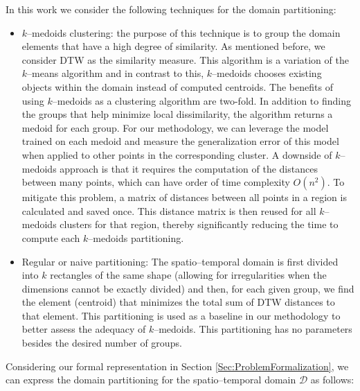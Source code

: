 In this work we consider the following techniques for the domain partitioning:

\begin{itemize}%
	\item $k$--medoids clustering: the purpose of this technique is to group the domain elements that have a high degree of similarity. As mentioned before, we consider DTW as the similarity measure. This algorithm is a variation of the $k$--means algorithm and in contrast to this, $k$--medoids chooses existing objects within the domain instead of computed centroids. The benefits of using $k$--medoids as a clustering algorithm are two-fold. In addition to finding the groups that help minimize local dissimilarity, the algorithm returns a medoid for each group. For our methodology, we can leverage the model trained on each medoid and measure the generalization error of this model when applied to other points in the corresponding cluster. A downside of $k$--medoids approach is that it requires the computation of the distances between many points, which can have order of time complexity $O(n^2)$. To mitigate this problem, a matrix of distances between all points in a region is calculated and saved once. This distance matrix is then reused for all $k$--medoids clusters for that region, thereby significantly reducing the time to compute each $k$--medoids partitioning. 
	
	\item Regular or naive partitioning: The spatio--temporal domain is first divided into $k$ rectangles of the same shape (allowing for irregularities when the dimensions cannot be exactly divided) and then, for each given group, we find the element (centroid) that minimizes the total sum of DTW distances to that element. This partitioning is used as a baseline in our methodology to better assess the adequacy of $k$--medoids. This partitioning has no parameters besides the desired number of groups.
\end{itemize}

Considering our formal representation in Section \ref{Sec:ProblemFormalization}, we can express the domain partitioning for the spatio--temporal domain $\mathcal{D}$ as follows:

